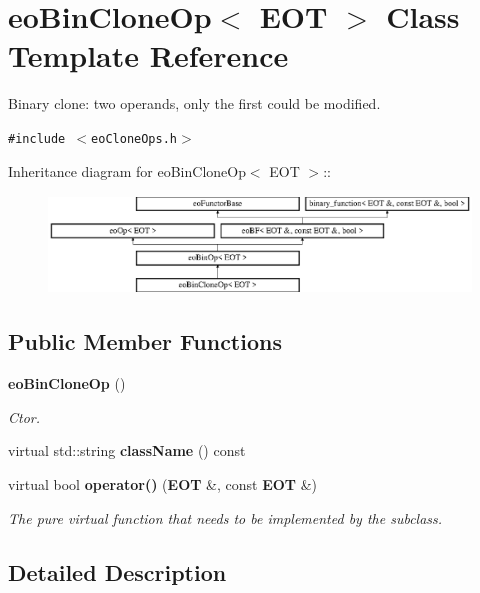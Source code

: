 \section{eo\-Bin\-Clone\-Op$<$ EOT $>$ Class Template Reference}
\label{classeo_bin_clone_op}
Binary clone: two operands, only the first could be modified.  


{\tt \#include $<$eo\-Clone\-Ops.h$>$}

Inheritance diagram for eo\-Bin\-Clone\-Op$<$ EOT $>$::\begin{figure}[H]
\begin{center}
\leavevmode
\includegraphics[height=2.60163cm]{classeo_bin_clone_op}
\end{center}
\end{figure}
\subsection*{Public Member Functions}
\begin{CompactItemize}
\item 
{\bf eo\-Bin\-Clone\-Op} ()\label{classeo_bin_clone_op_a0}

\begin{CompactList}\small\item\em Ctor. \item\end{CompactList}\item 
virtual std::string {\bf class\-Name} () const \label{classeo_bin_clone_op_a1}

\item 
virtual bool {\bf operator()} ({\bf EOT} \&, const {\bf EOT} \&)\label{classeo_bin_clone_op_a2}

\begin{CompactList}\small\item\em The pure virtual function that needs to be implemented by the subclass. \item\end{CompactList}\end{CompactItemize}


\subsection{Detailed Description}

